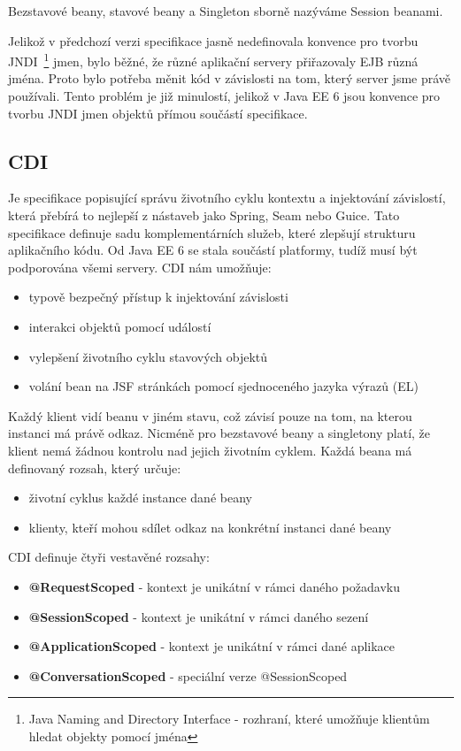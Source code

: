 \documentclass[122pt,oneside]{fithesis}
\begin{document}
Bezstavové beany, stavové beany a Singleton sborně nazýváme Session beanami.

Jelikož v předchozí verzi specifikace jasně nedefinovala konvence pro tvorbu JNDI~\footnote{Java Naming and Directory Interface - rozhraní, které umožňuje klientům hledat objekty pomocí jména} jmen, bylo běžné, že různé aplikační servery přiřazovaly EJB různá jména. Proto bylo potřeba měnit kód v závislosti na tom, který server jsme právě používali. Tento problém je již minulostí, jelikož v Java EE 6 jsou konvence pro tvorbu JNDI jmen objektů přímou součástí specifikace.

\subsection{CDI}
Je specifikace popisující správu životního cyklu kontextu a injektování závislostí, která přebírá to nejlepší z nástaveb jako Spring, Seam nebo Guice. Tato specifikace definuje sadu komplementárních služeb, které zlepšují strukturu aplikačního kódu. Od Java EE 6 se stala součástí platformy, tudíž musí být podporována všemi servery. CDI nám umožňuje:

\begin{itemize}
  \item typově bezpečný přístup k injektování závislosti
  \item interakci objektů pomocí událostí
  \item vylepšení životního cyklu stavových objektů
  \item volání bean na JSF stránkách pomocí sjednoceného jazyka výrazů (EL)
\end{itemize}

Každý klient vidí beanu v jiném stavu, což závisí pouze na tom, na kterou instanci má právě odkaz. Nicméně pro bezstavové beany a singletony platí, že klient nemá žádnou kontrolu nad jejich životním cyklem. Každá beana má definovaný rozsah, který určuje:

\begin{itemize}
  \item životní cyklus každé instance dané beany 
  \item klienty, kteří mohou sdílet odkaz na konkrétní instanci dané beany
\end{itemize}

CDI definuje čtyři vestavěné rozsahy:

\begin{itemize}
  \item{\bf @RequestScoped} - kontext je unikátní v rámci daného požadavku
  \item{\bf @SessionScoped} - kontext je unikátní v rámci daného sezení
  \item{\bf @ApplicationScoped} - kontext je unikátní v rámci dané aplikace
  \item{\bf @ConversationScoped} - speciální verze @SessionScoped
\end{itemize}
\end{document}
